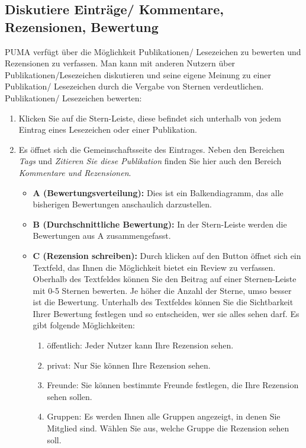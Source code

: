 \documentclass[b5paper,11pt,twoside]{scrbook} %
\begin{document}
\subsection{Diskutiere Einträge/ Kommentare, Rezensionen, Bewertung}
PUMA verfügt über die Möglichkeit Publikationen/ Lesezeichen zu bewerten und Rezensionen zu verfassen. Man kann mit anderen Nutzern über Publikationen/Lesezeichen diskutieren und seine eigene Meinung zu einer Publikation/ Lesezeichen durch die Vergabe von Sternen verdeutlichen.
\newline
\newline
Publikationen/ Lesezeichen bewerten:
\begin{enumerate}
    \item Klicken Sie auf die Stern-Leiste, diese befindet sich unterhalb von jedem Eintrag eines Lesezeichen oder einer Publikation.  
    \item Es öffnet sich die Gemeinschaftsseite des Eintrages. Neben den Bereichen \textit{Tags} und \textit{Zitieren Sie diese Publikation} finden Sie hier auch den Bereich \textit{Kommentare und Rezensionen}. 
    \begin{itemize} %
        \item \textbf{A (Bewertungsverteilung):} Dies ist ein Balkendiagramm, das alle bisherigen Bewertungen anschaulich darzustellen. %
        \item \textbf{B (Durchschnittliche Bewertung):} In der Stern-Leiste  werden die Bewertungen aus A zusammengefasst.
        \item \textbf{C (Rezension schreiben):} Durch klicken auf den Button öffnet sich ein Textfeld, das Ihnen die Möglichkeit bietet ein Review  zu verfassen. Oberhalb des Textfeldes können Sie den Beitrag auf einer Sternen-Leiste mit 0-5 Sternen bewerten. Je höher die Anzahl der Sterne, umso besser ist die Bewertung. Unterhalb des Textfeldes können Sie die Sichtbarkeit Ihrer Bewertung festlegen und so entscheiden, wer sie alles sehen darf. Es gibt folgende Möglichkeiten:
        \begin{enumerate}
            \item öffentlich: Jeder Nutzer kann Ihre Rezension sehen.
            \item privat: Nur Sie können Ihre Rezension sehen.
            \item Freunde: Sie können bestimmte Freunde festlegen, die Ihre Rezension sehen sollen.
            \item Gruppen: Es werden Ihnen alle Gruppen angezeigt, in denen Sie Mitglied sind. Wählen Sie aus, welche Gruppe die Rezension sehen soll.

\end{enumerate}
\end{itemize}
\end{enumerate}
\end{document}
